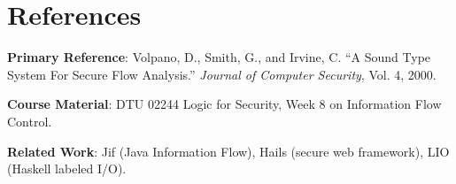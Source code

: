 \section{References}

\textbf{Primary Reference}: Volpano, D., Smith, G., and Irvine, C. ``A Sound Type System For Secure Flow Analysis.'' \textit{Journal of Computer Security}, Vol. 4, 2000. \cite{VSI96}

\textbf{Course Material}: DTU 02244 Logic for Security, Week 8 on Information Flow Control.

\textbf{Related Work}: Jif (Java Information Flow), Hails (secure web framework), LIO (Haskell labeled I/O).


